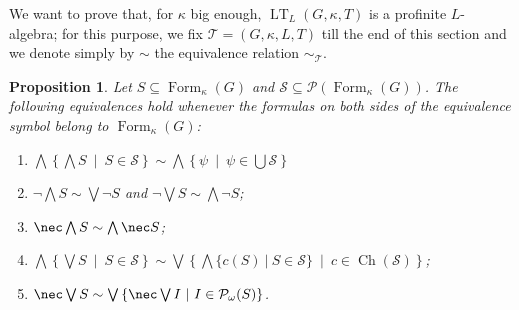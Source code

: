 \documentclass{article}
\newtheorem{prop}{Proposition}
\theoremstyle{definition}
\DeclareMathOperator{\LT}{LT}
\DeclareMathOperator{\Ch}{Ch}
\DeclareMathOperator{\Formulas}{Form}
\begin{document}
We want to prove that, for $\kappa$ big enough, $\LT_L(G,\kappa,T)$ is a profinite $L$-algebra; for this purpose,
we fix $\mathcal{T} = (G,\kappa,L,T)$  till the end of this section and we denote simply by $\sim$ the equivalence relation 
 $\sim_\mathcal{T}$.
%
\begin{prop}\label{prop:eq}
Let $S %
\subseteq \Formulas_\kappa(G)$ and $\mathscr{S} \subseteq \mathcal{P}(\Formulas_\kappa(G))$. The following equivalences hold whenever the formulas on both sides of the equivalence symbol belong to $\Formulas_\kappa(G)$:
\begin{enumerate}
    \item[{\rm (o)}] $\bigwedge \left\{ \bigwedge S \ \middle\vert\ S \in \mathscr{S}\right\}  \sim \bigwedge \left\{ \psi \ \middle\vert\ \psi \in \bigcup\mathscr{S}\right\}$
    \item[{\rm (i)}] $\neg \bigwedge S \sim \bigvee \neg S$ and $\neg \bigvee S \sim \bigwedge \neg S$;
    \item[{\rm (ii)}] $\nec \bigwedge S \sim \bigwedge \nec S$;
    \item[{\rm (iii)}] $\bigwedge \left\{\bigvee S\ \middle\vert\ S \in \mathscr{S} \right\} \sim \bigvee \left\{\bigwedge \{c(S)\ \vert\ S \in \mathscr{S}\}\ \middle\vert\ c \in \Ch(\mathscr{S})\right\}$;
    \item[{\rm (iv)}] $\nec \bigvee S \sim \bigvee \left\{\nec \bigvee I\ \middle\vert\ I \in \mathcal{P}_\omega(S)\right\}$.
\end{enumerate}
\end{prop}
\end{document}
